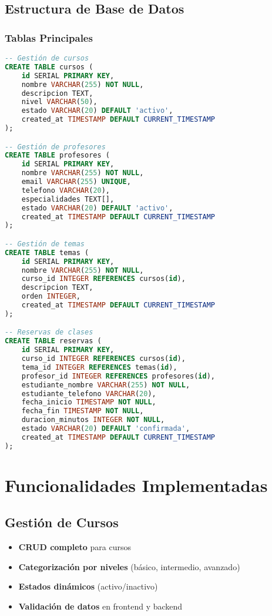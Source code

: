 \documentclass[12pt,a4paper]{article}
\begin{document}
\subsection{Estructura de Base de Datos}

\subsubsection{Tablas Principales}
\begin{lstlisting}[language=SQL]
-- Gestión de cursos
CREATE TABLE cursos (
    id SERIAL PRIMARY KEY,
    nombre VARCHAR(255) NOT NULL,
    descripcion TEXT,
    nivel VARCHAR(50),
    estado VARCHAR(20) DEFAULT 'activo',
    created_at TIMESTAMP DEFAULT CURRENT_TIMESTAMP
);

-- Gestión de profesores
CREATE TABLE profesores (
    id SERIAL PRIMARY KEY,
    nombre VARCHAR(255) NOT NULL,
    email VARCHAR(255) UNIQUE,
    telefono VARCHAR(20),
    especialidades TEXT[],
    estado VARCHAR(20) DEFAULT 'activo',
    created_at TIMESTAMP DEFAULT CURRENT_TIMESTAMP
);

-- Gestión de temas
CREATE TABLE temas (
    id SERIAL PRIMARY KEY,
    nombre VARCHAR(255) NOT NULL,
    curso_id INTEGER REFERENCES cursos(id),
    descripcion TEXT,
    orden INTEGER,
    created_at TIMESTAMP DEFAULT CURRENT_TIMESTAMP
);

-- Reservas de clases
CREATE TABLE reservas (
    id SERIAL PRIMARY KEY,
    curso_id INTEGER REFERENCES cursos(id),
    tema_id INTEGER REFERENCES temas(id),
    profesor_id INTEGER REFERENCES profesores(id),
    estudiante_nombre VARCHAR(255) NOT NULL,
    estudiante_telefono VARCHAR(20),
    fecha_inicio TIMESTAMP NOT NULL,
    fecha_fin TIMESTAMP NOT NULL,
    duracion_minutos INTEGER NOT NULL,
    estado VARCHAR(20) DEFAULT 'confirmada',
    created_at TIMESTAMP DEFAULT CURRENT_TIMESTAMP
);
\end{lstlisting}

\section{Funcionalidades Implementadas}

\subsection{Gestión de Cursos}
\begin{itemize}
    \item \textbf{CRUD completo} para cursos
    \item \textbf{Categorización por niveles} (básico, intermedio, avanzado)
    \item \textbf{Estados dinámicos} (activo/inactivo)
    \item \textbf{Validación de datos} en frontend y backend
\end{itemize}
\end{document}
